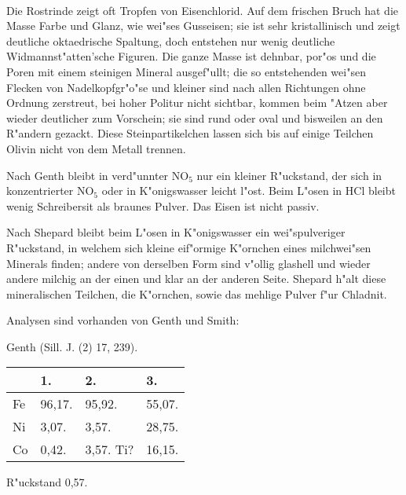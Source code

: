 \documentclass[a4paper, 11pt, oneside]{article}
\begin{document}
\paragraph{}
Die Rostrinde zeigt oft Tropfen von Eisenchlorid. Auf dem frischen Bruch hat die Masse Farbe und Glanz, wie wei"ses Gusseisen; sie ist sehr kristallinisch und zeigt deutliche oktaedrische Spaltung, doch entstehen nur wenig deutliche Widmannst"atten'sche Figuren. Die ganze Masse ist dehnbar, por"os und die Poren mit einem steinigen Mineral ausgef"ullt; die so entstehenden wei"sen Flecken von Nadelkopfgr"o"se und kleiner sind nach allen Richtungen ohne Ordnung zerstreut, bei hoher Politur nicht sichtbar, kommen beim "Atzen aber wieder deutlicher zum Vorschein; sie sind rund oder oval und bisweilen an den R"andern gezackt. Diese Steinpartikelchen lassen sich bis auf einige Teilchen Olivin nicht von dem Metall trennen.

Nach Genth bleibt in verd"unnter NO$_{5}$ nur ein kleiner R"uckstand, der sich in konzentrierter NO$_{5}$ oder in K"onigswasser leicht l"ost. Beim L"osen in HCl bleibt wenig Schreibersit als braunes Pulver. Das Eisen ist nicht passiv.

Nach Shepard bleibt beim L"osen in K"onigswasser ein wei"spulveriger R"uckstand, in welchem sich kleine eif"ormige K"ornchen eines milchwei"sen Minerals finden; andere von derselben Form sind v"ollig glashell und wieder andere milchig an der einen und klar an der anderen Seite. Shepard h"alt diese mineralischen Teilchen, die K"ornchen, sowie das mehlige Pulver f"ur Chladnit.

Analysen sind vorhanden von Genth und Smith:

Genth (Sill. J. (2) 17, 239).  
\begin{table}[H]
    \centering\swabfamily\Large
    \begin{tabular}{l l l l}
         & 1. & 2. & 3. \\ \hline
        Fe & 96,17. & 95,92. & 55,07. \\
        Ni & 3,07. & 3,57. & 28,75. \\
        Co & 0,42. & 3,57. Ti? & 16,15. \\
    \end{tabular}
\end{table}
R"uckstand 0,57.
\end{document}
